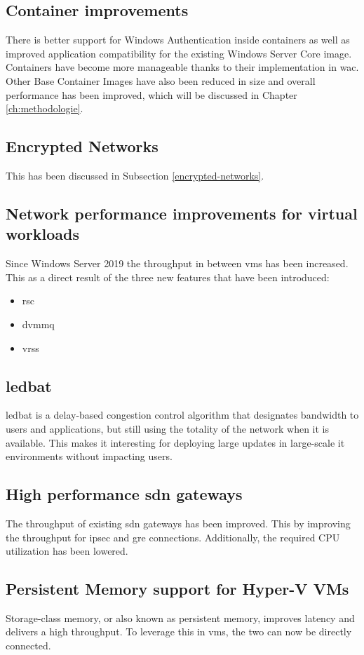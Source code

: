 \subsection*{Container improvements}
There is better support for Windows Authentication inside containers as well as improved application compatibility for the existing Windows Server Core image. 
Containers have become more manageable thanks to their implementation in \acrlong{wac}.
Other Base Container Images have also been reduced in size and overall performance has been improved, which will be discussed in Chapter \ref{ch:methodologie}. 
\subsection*{Encrypted Networks}
This has been discussed in Subsection \ref{encrypted-networks}.
\subsection*{Network performance improvements for virtual workloads}
Since Windows Server 2019 the throughput in between \acrshort{vm}s has been increased. 
This as a direct result of the three new features that have been introduced:
\begin{itemize}
	\item \acrfull{rsc}
	\item \acrfull{dvmmq}
	\item \acrfull{vrss}
\end{itemize}
\subsection*{\acrfull{ledbat}}
\acrshort{ledbat} is a delay-based congestion control algorithm that designates bandwidth to users and applications, but still using the totality of the network when it is available. \autocite{Shalunov2012}
This makes it interesting for deploying large updates in large-scale \acrshort{it} environments without impacting users.
\subsection*{High performance \acrshort{sdn} gateways}
The throughput of existing \acrshort{sdn} gateways has been improved. 
This by improving the throughput for \acrfull{ipsec} and \acrfull{gre} connections. 
Additionally, the required CPU utilization has been lowered.
\subsection*{Persistent Memory support for Hyper-V VMs}
Storage-class memory, or also known as persistent memory, improves latency and delivers a high throughput. 
To leverage this in \acrshort{vm}s, the two can now be directly connected.
